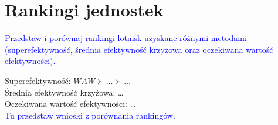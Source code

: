 \documentclass[a4paper,12pt]{article}
\begin{document}
\section{Rankingi jednostek}
\textcolor{blue}{Przedstaw i porównaj rankingi lotnisk uzyskane różnymi metodami (superefektywność, średnia efektywność krzyżowa oraz oczekiwana wartość efektywności).}

\noindent Superefektywność: $WAW \succ \ldots \succ \ldots$ \\
Średnia efektywność krzyżowa: \ldots \\
Oczekiwana wartość efektywności: \ldots \\

\textcolor{blue}{Tu przedstaw wnioski z porównania rankingów.}
\end{document}

